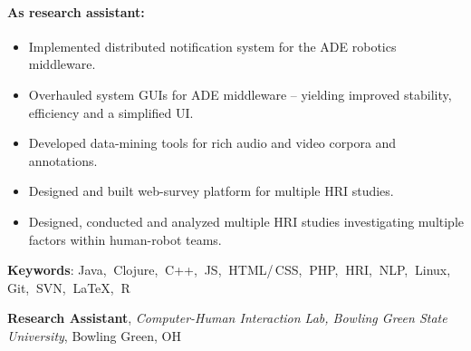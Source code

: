 \documentclass[10pt, letter]{article}
\newcommand{\years}[1]{\marginnote{\footnotesize #1}}
\newenvironment{desc*}{
  \begin{description}
    \setlength{\itemsep}{0.2pt}
    \setlength{\parskip}{-1pt}
    \setlength{\parsep}{0pt}
  }{
  \end{description}
}
\begin{document}
\paragraph{\textbf{As research assistant:}}
\begin{itemize}[leftmargin=*, parsep=-1pt]
\item Implemented distributed notification system for the ADE robotics
  middleware. 
\item Overhauled system GUIs for ADE middleware -- yielding improved
  stability, efficiency and a simplified UI. 
\item Developed data-mining tools for rich audio and video corpora and annotations. 
\item Designed and built web-survey platform for multiple HRI studies. 
\item Designed, conducted and analyzed multiple HRI studies
  investigating multiple factors within human-robot teams.
\end{itemize}
\vspace{-.2cm}
\begin{desc*}
\item[\rm \color{redblue} \textbf{Keywords}:] Java,$\:$ Clojure,$\:$ C++,$\:$
  JS,$\:$ HTML/\,CSS,$\:$ PHP,$\:$ HRI,$\:$ NLP,$\:$ Linux,$\:$ Git,$\:$ SVN,$\:$ \LaTeX,$\:$ R\\
\end{desc*}

\vspace{-.2cm}
\years{2010 - 2012}
\textbf{\fontsize{10.5pt}{1em}\selectfont Research Assistant}, 
\textit{Computer-Human Interaction Lab, Bowling Green State
  University}, Bowling Green, OH \\
\end{document}
